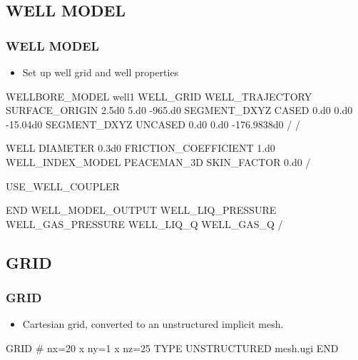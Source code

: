 \documentclass{beamer}
\begin{document}
\subsection{WELL MODEL}
\begin{frame}\frametitle{WELL MODEL}

\begin{itemize}
  \item Set up well grid and well properties
\end{itemize}

\begin{semiverbatim}
WELLBORE_MODEL well1
  WELL_GRID
    WELL_TRAJECTORY
      SURFACE_ORIGIN 2.5d0 5.d0 -965.d0
      SEGMENT_DXYZ CASED 0.d0 0.d0 -15.04d0
      SEGMENT_DXYZ UNCASED 0.d0 0.d0 -176.9838d0
    /
  /

\newpage
  WELL
    DIAMETER 0.3d0
    FRICTION_COEFFICIENT 1.d0
    WELL_INDEX_MODEL PEACEMAN_3D
    SKIN_FACTOR 0.d0
  /

  USE_WELL_COUPLER

END
\newpage
WELL_MODEL_OUTPUT
  WELL_LIQ_PRESSURE
  WELL_GAS_PRESSURE
  WELL_LIQ_Q
  WELL_GAS_Q
/

\end{semiverbatim}
\end{frame}
\subsection{GRID}
\begin{frame}\frametitle{GRID}

\begin{itemize}
  \item Cartesian grid, converted to an unstructured implicit mesh.
\end{itemize}

\begin{semiverbatim}
GRID
  # nx=20 x ny=1 x nz=25
  TYPE UNSTRUCTURED mesh.ugi
END
\end{semiverbatim}

\end{frame}
\end{document}
